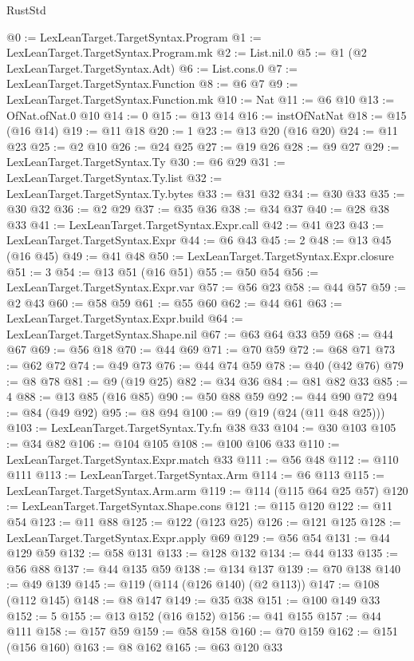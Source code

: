 \begin{lexlean}{RustStd}
\begin{coremodule}
@0 := LexLeanTarget.TargetSyntax.Program
@1 := LexLeanTarget.TargetSyntax.Program.mk
@2 := List.nil.{0}
@5 := @1 (@2 LexLeanTarget.TargetSyntax.Adt)
@6 := List.cons.{0}
@7 := LexLeanTarget.TargetSyntax.Function
@8 := @6 @7
@9 := LexLeanTarget.TargetSyntax.Function.mk
@10 := Nat
@11 := @6 @10
@13 := OfNat.ofNat.{0} @10
@14 := 0
@15 := @13 @14
@16 := instOfNatNat
@18 := @15 (@16 @14)
@19 := @11 @18
@20 := 1
@23 := @13 @20 (@16 @20)
@24 := @11 @23
@25 := @2 @10
@26 := @24 @25
@27 := @19 @26
@28 := @9 @27
@29 := LexLeanTarget.TargetSyntax.Ty
@30 := @6 @29
@31 := LexLeanTarget.TargetSyntax.Ty.list
@32 := LexLeanTarget.TargetSyntax.Ty.bytes
@33 := @31 @32
@34 := @30 @33
@35 := @30 @32
@36 := @2 @29
@37 := @35 @36
@38 := @34 @37
@40 := @28 @38 @33
@41 := LexLeanTarget.TargetSyntax.Expr.call
@42 := @41 @23
@43 := LexLeanTarget.TargetSyntax.Expr
@44 := @6 @43
@45 := 2
@48 := @13 @45 (@16 @45)
@49 := @41 @48
@50 := LexLeanTarget.TargetSyntax.Expr.closure
@51 := 3
@54 := @13 @51 (@16 @51)
@55 := @50 @54
@56 := LexLeanTarget.TargetSyntax.Expr.var
@57 := @56 @23
@58 := @44 @57
@59 := @2 @43
@60 := @58 @59
@61 := @55 @60
@62 := @44 @61
@63 := LexLeanTarget.TargetSyntax.Expr.build
@64 := LexLeanTarget.TargetSyntax.Shape.nil
@67 := @63 @64 @33 @59
@68 := @44 @67
@69 := @56 @18
@70 := @44 @69
@71 := @70 @59
@72 := @68 @71
@73 := @62 @72
@74 := @49 @73
@76 := @44 @74 @59
@78 := @40 (@42 @76)
@79 := @8 @78
@81 := @9 (@19 @25)
@82 := @34 @36
@84 := @81 @82 @33
@85 := 4
@88 := @13 @85 (@16 @85)
@90 := @50 @88 @59
@92 := @44 @90 @72
@94 := @84 (@49 @92)
@95 := @8 @94
@100 := @9 (@19 (@24 (@11 @48 @25)))
@103 := LexLeanTarget.TargetSyntax.Ty.fn @38 @33
@104 := @30 @103
@105 := @34 @82
@106 := @104 @105
@108 := @100 @106 @33
@110 := LexLeanTarget.TargetSyntax.Expr.match @33
@111 := @56 @48
@112 := @110 @111
@113 := LexLeanTarget.TargetSyntax.Arm
@114 := @6 @113
@115 := LexLeanTarget.TargetSyntax.Arm.arm
@119 := @114 (@115 @64 @25 @57)
@120 := LexLeanTarget.TargetSyntax.Shape.cons
@121 := @115 @120
@122 := @11 @54
@123 := @11 @88
@125 := @122 (@123 @25)
@126 := @121 @125
@128 := LexLeanTarget.TargetSyntax.Expr.apply @69
@129 := @56 @54
@131 := @44 @129 @59
@132 := @58 @131
@133 := @128 @132
@134 := @44 @133
@135 := @56 @88
@137 := @44 @135 @59
@138 := @134 @137
@139 := @70 @138
@140 := @49 @139
@145 := @119 (@114 (@126 @140) (@2 @113))
@147 := @108 (@112 @145)
@148 := @8 @147
@149 := @35 @38
@151 := @100 @149 @33
@152 := 5
@155 := @13 @152 (@16 @152)
@156 := @41 @155
@157 := @44 @111
@158 := @157 @59
@159 := @58 @158
@160 := @70 @159
@162 := @151 (@156 @160)
@163 := @8 @162
@165 := @63 @120 @33

\end{coremodule}
\end{lexlean}
